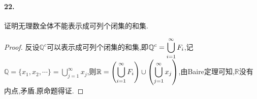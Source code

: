 \documentclass[12pt, a4paper, oneside]{ctexart}
\begin{document}
\paragraph{22.}证明无理数全体不能表示成可列个闭集的和集.
\begin{proof}
    反设$\mathbb{Q}^c$可以表示成可列个闭集的和集,即$\displaystyle \mathbb{Q}^c = \bigcup_{i = 1}^{\infty}F_{i}$,记$\mathbb{Q} = \{x_1,x_2,\cdots\} = \bigcup_{j=1}^{\infty}x_j$,则$\displaystyle\mathbb{R} = \left(\bigcup_{i=1}^{\infty}F_i\right)\cup\left(\bigcup_{j=1}^{\infty}x_j\right)$,由Baire定理可知,$\mathbb{R}$没有内点,矛盾.原命题得证.
\end{proof}

\iffalse
\centerline{
    \texttt{[image: figure.png]}
}
\fi
\iffalse
\renewcommand\arraystretch{0.8} %
\begin{table}[!htbp] %
    \centering %
    \begin{tabular}{p{1cm}<{\centering}p{1cm}<{\centering}p{3cm}<{\centering}p{5cm}<{\centering}} %
        \toprule
        $x_i$ & $f[x_1]$ & $f[x_i,x_{i+1}]$ & $f[x_i,x_{i+1},x_{i+2}]$ \\
        \midrule
        $x_0$ & $f(x_0)$ &                  &                          \\
        $x_0$ & $f(x_0)$ & $f'(x_0)$        &                          \\
        $x_0$ & $f(x_1)$ & $\frac{f(x_1)-f(x_0)}{x_1-x_0}$ & $\frac{f(x_1)-f(x_0)}{(x_1-x_0)^2}-\frac{f'(x_0)}{x_1-x_0}$\\
        \bottomrule
    \end{tabular}
\end{table}

\def\Log{\text{Log}} %
$\Log$ %
\fi
\end{document}
